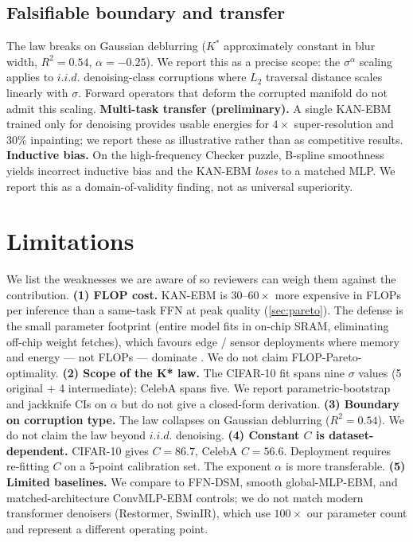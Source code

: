 \documentclass{article}
\begin{document}
\subsection{Falsifiable boundary and transfer}
The law breaks on Gaussian deblurring ($K^*$ approximately constant in blur width, $R^2{=}0.54$, $\alpha{=}-0.25$). We report this as a precise scope: the $\sigma^\alpha$ scaling applies to $i.i.d.$ denoising-class corruptions where $L_2$ traversal distance scales linearly with $\sigma$. Forward operators that deform the corrupted manifold do not admit this scaling. \textbf{Multi-task transfer (preliminary).} A single KAN-EBM trained only for denoising provides usable energies for $4\times$ super-resolution and 30\% inpainting; we report these as illustrative rather than as competitive results. \textbf{Inductive bias.} On the high-frequency Checker puzzle, B-spline smoothness yields incorrect inductive bias and the KAN-EBM \emph{loses} to a matched MLP. We report this as a domain-of-validity finding, not as universal superiority.

\section{Limitations}
\label{sec:limitations}
We list the weaknesses we are aware of so reviewers can weigh them against the contribution. \textbf{(1) FLOP cost.} KAN-EBM is $30$--$60{\times}$ more expensive in FLOPs per inference than a same-task FFN at peak quality (\cref{sec:pareto}). The defense is the small parameter footprint (entire model fits in on-chip SRAM, eliminating off-chip weight fetches), which favours edge / sensor deployments where memory and energy --- not FLOPs --- dominate \citep{horowitz2014energy}. We do not claim FLOP-Pareto-optimality. \textbf{(2) Scope of the K* law.} The CIFAR-10 fit spans nine $\sigma$ values (5 original $+$ 4 intermediate); CelebA spans five. We report parametric-bootstrap and jackknife CIs on $\alpha$ but do not give a closed-form derivation. \textbf{(3) Boundary on corruption type.} The law collapses on Gaussian deblurring ($R^2{=}0.54$). We do not claim the law beyond $i.i.d.$ denoising. \textbf{(4) Constant $C$ is dataset-dependent.} CIFAR-10 gives $C{=}86.7$, CelebA $C{=}56.6$. Deployment requires re-fitting $C$ on a 5-point calibration set. The exponent $\alpha$ is more transferable. \textbf{(5) Limited baselines.} We compare to FFN-DSM, smooth global-MLP-EBM, and matched-architecture ConvMLP-EBM controls; we do not match modern transformer denoisers (Restormer, SwinIR), which use $100{\times}$ our parameter count and represent a different operating point.
\end{document}

